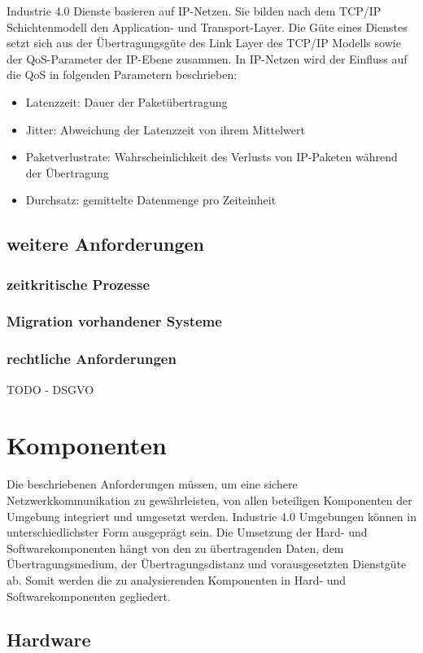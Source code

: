 Industrie 4.0 Dienste basieren auf IP-Netzen. Sie bilden nach dem TCP/IP Schichtenmodell den Application- und Transport-Layer. Die Güte eines Dienstes setzt sich aus der Übertragungsgüte des Link Layer des TCP/IP Modells sowie der \ac{QoS}-Parameter der IP-Ebene zusammen. In IP-Netzen wird der Einfluss auf die \ac{QoS} in folgenden Parametern beschrieben:
\begin{itemize}
    \item Latenzzeit: Dauer der Paketübertragung
    \item Jitter: Abweichung der Latenzzeit von ihrem Mittelwert
    \item Paketverlustrate: Wahrscheinlichkeit des Verlusts von IP-Paketen während der Übertragung
    \item Durchsatz: gemittelte Datenmenge pro Zeiteinheit
\end{itemize}

\subsection{weitere Anforderungen}

\subsubsection{zeitkritische Prozesse}
\subsubsection{Migration vorhandener Systeme}
\subsubsection{rechtliche Anforderungen}
TODO - DSGVO

\section{Komponenten}
Die beschriebenen Anforderungen müssen, um eine sichere Netzwerkkommunikation zu gewährleisten, von allen beteiligen Komponenten der Umgebung integriert und umgesetzt werden. Industrie 4.0 Umgebungen können in unterschiedlichster Form ausgeprägt sein. Die Umsetzung der Hard- und Softwarekomponenten hängt von den zu übertragenden Daten, dem Übertragungsmedium, der Übertragungsdistanz und vorausgesetzten Dienstgüte ab. Somit werden die zu analysierenden Komponenten in Hard- und Softwarekomponenten gegliedert.

\subsection{Hardware}
